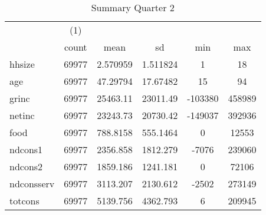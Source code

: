 \begin{table}[htbp]\centering
\def\sym#1{\ifmmode^{#1}\else\(^{#1}\)\fi}
\caption{Summary Quarter 2 \label{sum\_Q2}}
\begin{tabular}{l*{1}{ccccc}}
\hline\hline
            &\multicolumn{1}{c}{(1)}&            &            &            &            \\
            &       count&        mean&          sd&         min&         max\\
\hline
hhsize      &       69977&    2.570959&    1.511824&           1&          18\\
age         &       69977&    47.29794&    17.67482&          15&          94\\
grinc       &       69977&    25463.11&    23011.49&     -103380&      458989\\
netinc      &       69977&    23243.73&    20730.42&     -149037&      392936\\
food        &       69977&    788.8158&    555.1464&           0&       12553\\
ndcons1     &       69977&    2356.858&    1812.279&       -7076&      239060\\
ndcons2     &       69977&    1859.186&    1241.181&           0&       72106\\
ndconsserv  &       69977&    3113.207&    2130.612&       -2502&      273149\\
totcons     &       69977&    5139.756&    4362.793&           6&      209945\\
\hline\hline
\end{tabular}
\end{table}
